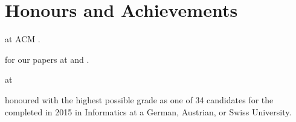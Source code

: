 \section{Honours and Achievements}
\begin{cvitemize}
    \item {} at ACM .
    \item {} for our papers at  and .
    \item {} at
        \begin{inlineItemize}
        \item {}
        \item {}
        \item {}
        \end{inlineItemize}
    \item {} honoured with the highest possible grade \newline
           as one of 34 candidates for the  completed in 2015 in Informatics at a German, Austrian, or Swiss University.
\end{cvitemize}